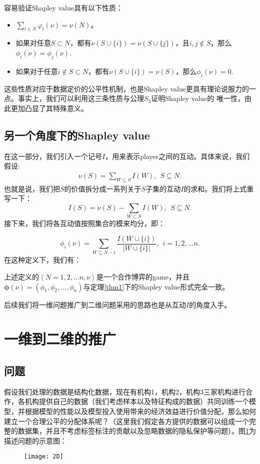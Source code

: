 容易验证Shapley value具有以下性质：
\begin{itemize}
	\item $\sum_{i \in N} \varphi_i(\nu) = \nu(N)$。
	\item 如果对任意$S\subset N$，都有$\nu(S\cup\{i\})=\nu(S\cup\{j\})$，且$i, j\notin S$，那么$\phi_i(\nu)=\phi_j(\nu)$.
	\item 如果对于任意$i\notin S\subset N$，都有$\nu(S\cup\{i\})=\nu(S)$，那么$\phi_i(\nu)=0$.
\end{itemize}

这些性质对应于数据定价的公平性机制，也是Shapley value更具有理论说服力的一点。事实上，我们可以利用这三条性质与公理$S_3$证明Shapley value的
唯一性，由此更加凸显了其特殊意义。

\subsection{另一个角度下的Shapley value}\label{I}
在这一部分，我们引入一个记号$I$，用来表示player之间的互动。具体来说，我们假设:
\begin{gather}
	\nu(S)=\sum_{W\subseteq S} I(W), \ \ S\subseteq N.
\end{gather}
也就是说，我们把$S$的价值拆分成一系列关于$S$子集的互动$I$的求和。我们将上式重写一下：
\begin{equation}
	I(S)=\nu(S)-\sum_{W\subset S} I(W), \ \ S\subseteq N.
\end{equation}
接下来，我们将各互动值按照集合的模来均分，即：

\begin{equation}
	\phi_i(\nu)=\sum_{W\subseteq N-{i}} \frac{I(W\cup \{i\})}{|W\cup \{i\}|}, \ \ i=1,2,...n.
\end{equation}
在这种定义下，我们有：
\begin{theorem}
	上述定义的$\left\langle N={1,2,...n}, \nu\right\rangle$是一个合作博弈的game，并且$\mathbf{\phi}(\nu)=(\phi_1, \phi_2,...,\phi_n)$与定理\ref{thm1}下的Shapley value形式完全一致。
\end{theorem}
后续我们将一维问题推广到二维问题采用的思路也是从互动$I$的角度入手。

\section{一维到二维的推广}
\subsection{问题}
假设我们处理的数据是结构化数据，现在有机构1，机构2，机构3三家机构进行合作，各机构提供自己的数据（我们考虑样本以及特征构成的数据）共同训练一个模型，并根据模型的性能以及模型投入使用带来的经济效益进行价值分配，那么如何建立一个合理公平的分配体系呢？（这里我们假定各方提供的数据可以组成一个完整的数据集，并且不考虑标签标注的贡献以及忽略数据的隐私保护等问题）。图\ref{fig:2D}为描述问题的示意图：
\begin{figure}[H]
	\centering
	\texttt{[image: 2D]} %
	\label{fig:2D}
\end{figure}


